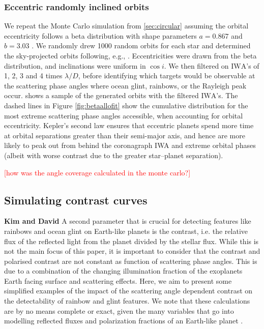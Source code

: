 \documentclass[
    usenatbib,
]{mnras}
\newcommand{\todo}[1]{\textcolor{red}{[#1]}}
\newcommand{\IWA}{\ensuremath{\mathrm{IWA}}}
\begin{document}
\subsubsection{Eccentric randomly inclined orbits}
\label{sec:eccentric}
We repeat the Monte Carlo simulation from \cref{sec:circular} assuming the orbital eccentricity follows a beta distribution with shape parameters $a=0.867$ and $b=3.03$ \citep{2013MNRAS.434L..51K}. 
%
We randomly drew 1000 random orbits for each star and determined the sky-projected orbits following, e.g., \cite{2010exop.book...15M}. Eccentricities were drawn from the beta distribution, and inclinations were uniform in $\cos i$. 
%
We then filtered on \IWA's of 1, 2, 3 and 4 times $\lambda / D$, before identifying which targets would be observable at the scattering phase angles where ocean glint, rainbows, or the Rayleigh peak occur. 
%
 shows a sample of the generated orbits with the filtered \IWA's. The dashed lines in Figure \ref{fig:betaallofit} show the cumulative distribution for the most extreme scattering phase angles accessible, when accounting for orbital eccentricity.  Kepler's second law ensures that eccentric planets spend more time at orbital separations greater than their semi-major axis, and hence are more likely to peak out from behind the coronagraph IWA and extreme orbital phases (albeit with worse contrast due to the greater star--planet separation). 

\todo{how was the angle coverage calculated in the monte carlo?}

%

\subsection{Simulating contrast curves}
\textbf{Kim and David}
%
A second parameter that is crucial for detecting features like rainbows and ocean glint on Earth-like planets is the contrast, i.e. the relative flux of the reflected light from the planet divided by the stellar flux. 
%
While this is not the main focus of this paper, it is important to consider that the contrast and polarised contrast are not constant as function of scattering phase angles.
%
This is due to a combination of the changing illumination fraction of the exoplanets Earth facing surface and scattering effects.
%
Here, we aim to present some simplified examples of the impact of the scattering angle dependent contrast on the detectability of rainbow and glint features. 
%
We note that these calculations are by no means complete or exact, given the many variables that go into modelling reflected fluxes and polarization fractions of an Earth-like planet \citep{ treesstam2019,trees2022}.
\end{document}
